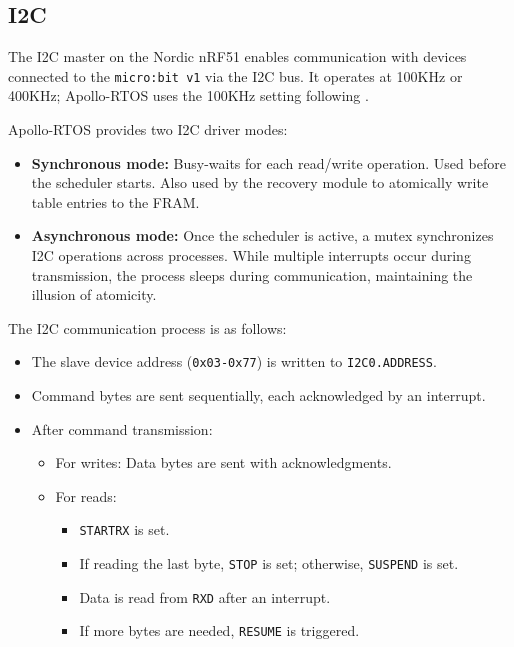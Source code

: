 \subsection{I2C}

The I2C master on the Nordic nRF51 enables communication with devices connected to the
\texttt{micro:bit v1} via the I2C bus. It operates at 100KHz or 400KHz; Apollo-RTOS
uses the 100KHz setting following \citet{microbian}.

\ifsubmission\newpage\fi
Apollo-RTOS provides two I2C driver modes:
\begin{itemize}
    \item \textbf{Synchronous mode:} Busy-waits for each read/write operation. Used
        before the scheduler starts. Also used by the recovery module to atomically
        write table entries to the FRAM.
    \item \textbf{Asynchronous mode:} Once the scheduler is active, a mutex
        synchronizes I2C operations across processes. While multiple interrupts occur
        during transmission, the process sleeps during communication, maintaining the
        illusion of atomicity.
\end{itemize}

The I2C communication process is as follows:
\begin{itemize}[left=0pt]
    \item The slave device address (\lstinline[style=myagc]|0x03-0x77|) is written to
    \lstinline[style=myagc]|I2C0.ADDRESS|.
    \item Command bytes are sent sequentially, each acknowledged by an interrupt.
    \item After command transmission:
        \begin{itemize}
            \item For writes: Data bytes are sent with acknowledgments.
            \item For reads: 
                \begin{itemize}
                    \item \lstinline[style=myagc]|STARTRX| is set.
                    \item If reading the last byte, \lstinline[style=myagc]|STOP| is
                        set; otherwise, \lstinline[style=myagc]|SUSPEND| is set.
                    \item Data is read from \lstinline[style=myagc]|RXD| after an
                        interrupt.
                    \item If more bytes are needed, \lstinline[style=myagc]|RESUME| is
                        triggered.
                \end{itemize}
        \end{itemize}
\end{itemize}

